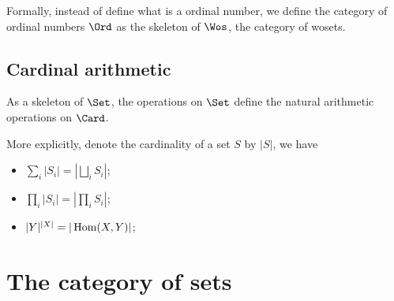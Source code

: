   Formally, instead of define what is a ordinal number, we define the category of ordinal numbers $\Ord$ as the skeleton of $\Wos$, the category of wosets.

\subsection{Cardinal arithmetic}
  As a skeleton of $\Set$, the operations on $\Set$ define the natural arithmetic operations on $\Card$.

  More explicitly, denote the cardinality of a set $S$ by $|S|$, we have
  \begin{itemize}
    \item $\sum_i|S_i|=|\bigsqcup_i S_i|$;
    \item $\prod_i|S_i|=|\prod_i S_i|$;
    \item $|Y|^{|X|}=|\operatorname{Hom}(X,Y)|$;
  \end{itemize}

\section{The category of sets}
